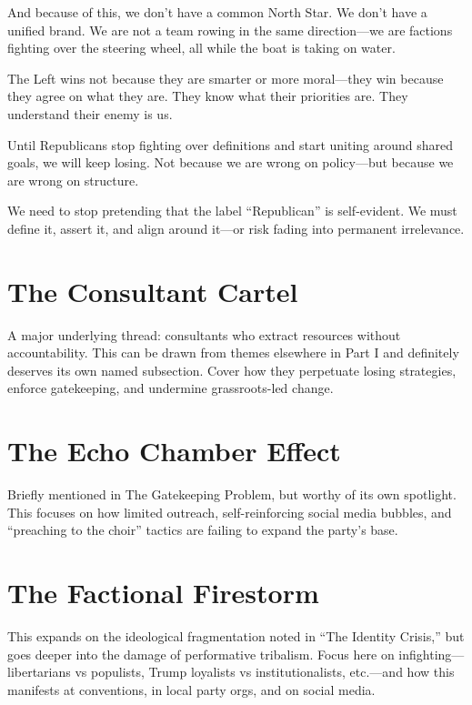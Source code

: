 And because of this, we don’t have a common North Star. We don’t have a unified brand. We are not a team rowing in the same direction—we are factions fighting over the steering wheel, all while the boat is taking on water.

The Left wins not because they are smarter or more moral—they win because they agree on what they are. They know what their priorities are. They understand their enemy is us.

Until Republicans stop fighting over definitions and start uniting around shared goals, we will keep losing. Not because we are wrong on policy—but because we are wrong on structure.

We need to stop pretending that the label “Republican” is self-evident. We must define it, assert it, and align around it—or risk fading into permanent irrelevance.

\section{The Consultant Cartel}
A major underlying thread: consultants who extract resources without accountability. This can be drawn from themes elsewhere in Part I and definitely deserves its own named subsection. Cover how they perpetuate losing strategies, enforce gatekeeping, and undermine grassroots-led change.
\section{The Echo Chamber Effect}
Briefly mentioned in The Gatekeeping Problem, but worthy of its own spotlight. This focuses on how limited outreach, self-reinforcing social media bubbles, and “preaching to the choir” tactics are failing to expand the party's base.
\section{The Factional Firestorm}
This expands on the ideological fragmentation noted in “The Identity Crisis,” but goes deeper into the damage of performative tribalism. Focus here on infighting—libertarians vs populists, Trump loyalists vs institutionalists, etc.—and how this manifests at conventions, in local party orgs, and on social media.












